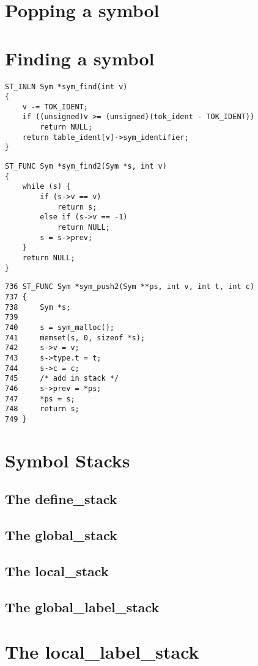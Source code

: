 \begin{tcc_desc}
\end{tcc_desc}


\section{Popping a symbol}

\section{Finding a symbol}

\begin{verbatim}
ST_INLN Sym *sym_find(int v)
{
    v -= TOK_IDENT;
    if ((unsigned)v >= (unsigned)(tok_ident - TOK_IDENT))
        return NULL;
    return table_ident[v]->sym_identifier;
}
\end{verbatim}

\begin{verbatim}
ST_FUNC Sym *sym_find2(Sym *s, int v)
{
    while (s) {
        if (s->v == v)
            return s;
        else if (s->v == -1)
            return NULL;
        s = s->prev;
    }
    return NULL;
}
\end{verbatim}

\begin{verbatim}
736 ST_FUNC Sym *sym_push2(Sym **ps, int v, int t, int c)
737 {
738     Sym *s;
739 
740     s = sym_malloc();
741     memset(s, 0, sizeof *s);
742     s->v = v;
743     s->type.t = t;
744     s->c = c;
745     /* add in stack */
746     s->prev = *ps;
747     *ps = s;
748     return s;
749 }
\end{verbatim}

\section{Symbol Stacks}

\subsection{The define\_stack}

\subsection{The global\_stack}

\subsection{The local\_stack}

\subsection{The global\_label\_stack}

\section{The local\_label\_stack}




